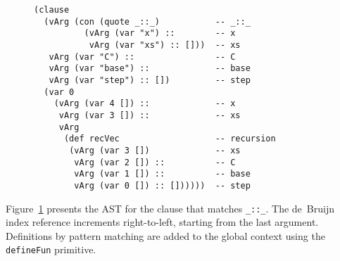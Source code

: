 \documentclass[runningheads]{llncs}
\begin{document}
\begin{figure}
\centering
\begingroup
\fontsize{7.9pt}{8pt}\selectfont
\begin{Verbatim}
(clause
  (vArg (con (quote _::_)           -- _::_
          (vArg (var "x") ::        -- x
           vArg (var "xs") :: []))  -- xs
   vArg (var "C") ::                -- C
   vArg (var "base") ::             -- base
   vArg (var "step") :: [])         -- step
  (var 0                            
    (vArg (var 4 []) ::             -- x
     vArg (var 3 []) ::             -- xs
     vArg
      (def recVec                   -- recursion
       (vArg (var 3 [])             -- xs
        vArg (var 2 []) ::          -- C
        vArg (var 1 []) ::          -- base
        vArg (var 0 []) :: [])))))  -- step

\end{Verbatim}
\endgroup
  \label{fig:ast-cdef}
\end{figure}

%


Figure~\ref{fig:ast-cdef} presents the AST for the clause that matches \texttt{\_::\_}.
The de~Bruijn index reference increments right-to-left, starting from the last argument.
Definitions by pattern matching are added to the global context using the \texttt{defineFun} primitive.
%
%
\end{document}
